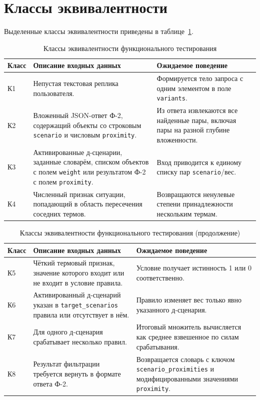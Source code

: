\section{Классы эквивалентности}

Выделенные классы эквивалентности приведены в
таблице~\ref{tbl:test_equivalence_classes}.

\begin{table}[H]
	\centering
	\caption{Классы эквивалентности функционального тестирования}
	\label{tbl:test_equivalence_classes}
		\begin{tabularx}{\textwidth}{|p{}|p{}|X|}
		\hline
		\textbf{Класс} & \textbf{Описание входных данных} &
		\textbf{Ожидаемое поведение} \\
		\hline
		К1 & Непустая текстовая реплика пользователя. & Формируется тело
		запроса с одним элементом в поле \texttt{variants}. \\
		\hline
		К2 & Вложенный JSON-ответ Ф-2, содержащий объекты со строковым
		\texttt{scenario} и числовым \texttt{proximity}. & Из ответа
		извлекаются все найденные пары, включая пары на разной глубине
		вложенности. \\
		\hline
		К3 & Активированные д-сценарии, заданные словарём, списком объектов с
		полем \texttt{weight} или результатом Ф-2 с полем
		\texttt{proximity}. & Вход приводится к единому списку пар
		\texttt{scenario}/вес. \\
		\hline
		К4 & Численный признак ситуации, попадающий в область пересечения
		соседних термов. & Возвращаются ненулевые степени принадлежности
		нескольким термам. \\
		\hline
	\end{tabularx}
\end{table}

\begin{table}[H]
	\centering
	\caption{Классы эквивалентности функционального тестирования (продолжение)}
	\begin{tabularx}{\textwidth}{|p{}|p{}|X|}
		\hline
		\textbf{Класс} & \textbf{Описание входных данных} &
		\textbf{Ожидаемое поведение} \\
		\hline
		К5 & Чёткий термовый признак, значение которого входит или не входит в
		условие правила. & Условие получает истинность 1 или 0
		соответственно. \\
		\hline
		К6 & Активированный д-сценарий указан в \texttt{target\_scenarios}
		правила или отсутствует в нём. & Правило изменяет вес только явно
		указанного д-сценария. \\
		\hline
		К7 & Для одного д-сценария срабатывает несколько правил. & Итоговый
		множитель вычисляется как среднее взвешенное по силам срабатывания. \\
		\hline
		К8 & Результат фильтрации требуется вернуть в формате ответа Ф-2. &
		Возвращается словарь с ключом \texttt{scenario\_proximities} и
		модифицированными значениями \texttt{proximity}. \\
		\hline
	\end{tabularx}
\end{table}

